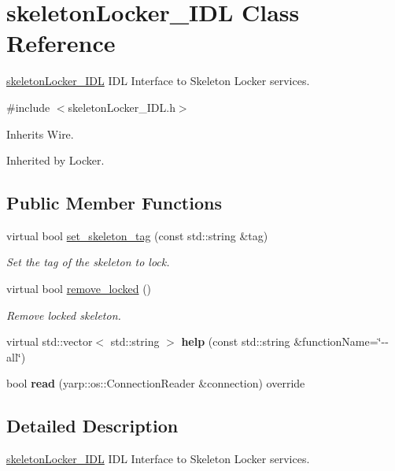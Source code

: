 \section{skeleton\+Locker\+\_\+\+I\+DL Class Reference}
\label{classskeletonLocker__IDL}


\hyperlink{classskeletonLocker__IDL}{skeleton\+Locker\+\_\+\+I\+DL} I\+DL Interface to Skeleton Locker services.  




{\ttfamily \#include $<$skeleton\+Locker\+\_\+\+I\+D\+L.\+h$>$}



Inherits Wire.



Inherited by Locker.

\subsection*{Public Member Functions}
\begin{DoxyCompactItemize}
\item 
virtual bool \hyperlink{classskeletonLocker__IDL_aae7859cb991b4c0202529731a92ec088}{set\+\_\+skeleton\+\_\+tag} (const std\+::string \&tag)
\begin{DoxyCompactList}\small\item\em Set the tag of the skeleton to lock. \end{DoxyCompactList}\item 
virtual bool \hyperlink{classskeletonLocker__IDL_a04c6d47ceeba5f4caac0695d173661f5}{remove\+\_\+locked} ()
\begin{DoxyCompactList}\small\item\em Remove locked skeleton. \end{DoxyCompactList}\item 
\mbox{\label{classskeletonLocker__IDL_a808faf435f8591d88a05ab71a733a782}} 
virtual std\+::vector$<$ std\+::string $>$ {\bfseries help} (const std\+::string \&function\+Name=\char`\"{}-\/-\/all\char`\"{})
\item 
\mbox{\label{classskeletonLocker__IDL_a6fdcef028359598c359975f075b8b67b}} 
bool {\bfseries read} (yarp\+::os\+::\+Connection\+Reader \&connection) override
\end{DoxyCompactItemize}


\subsection{Detailed Description}
\hyperlink{classskeletonLocker__IDL}{skeleton\+Locker\+\_\+\+I\+DL} I\+DL Interface to Skeleton Locker services. 

